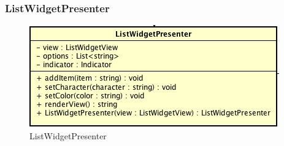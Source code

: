 \subsubsection{ListWidgetPresenter}

\label{ListWidgetPresenter}
\begin{figure}[ht]
	\centering
	\includegraphics[scale=0.5]{Sezioni/SottosezioniST/img/ListWidgetPresenter.png}
	\caption{ListWidgetPresenter}
\end{figure}


